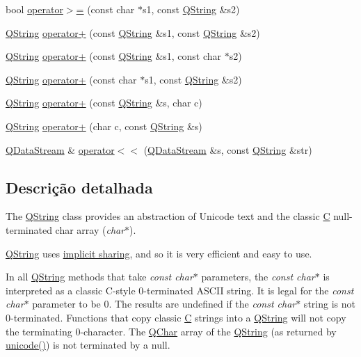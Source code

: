 \begin{DoxyCompactItemize}
\item 
bool \hyperlink{class_q_string_a9f4787df63780750a94f131e7a35ac6c}{operator$>$=} (const char $\ast$s1, const \hyperlink{class_q_string}{Q\-String} \&s2)
\item 
\hyperlink{class_q_string}{Q\-String} \hyperlink{class_q_string_ae485733155e818a24470bab6b39007a3}{operator+} (const \hyperlink{class_q_string}{Q\-String} \&s1, const \hyperlink{class_q_string}{Q\-String} \&s2)
\item 
\hyperlink{class_q_string}{Q\-String} \hyperlink{class_q_string_aeebc8da866e999cf9d98f409149a7274}{operator+} (const \hyperlink{class_q_string}{Q\-String} \&s1, const char $\ast$s2)
\item 
\hyperlink{class_q_string}{Q\-String} \hyperlink{class_q_string_ad31066c16adb556c4e773939da16a894}{operator+} (const char $\ast$s1, const \hyperlink{class_q_string}{Q\-String} \&s2)
\item 
\hyperlink{class_q_string}{Q\-String} \hyperlink{class_q_string_a646dae5a832bf142e3fd6eed4cd29263}{operator+} (const \hyperlink{class_q_string}{Q\-String} \&s, char c)
\item 
\hyperlink{class_q_string}{Q\-String} \hyperlink{class_q_string_ab79668b32f01247149267b5b77669165}{operator+} (char c, const \hyperlink{class_q_string}{Q\-String} \&s)
\item 
\hyperlink{class_q_data_stream}{Q\-Data\-Stream} \& \hyperlink{class_q_string_a5d8281fc5ce5c2b6e6e9fd2b9f66c32c}{operator$<$$<$} (\hyperlink{class_q_data_stream}{Q\-Data\-Stream} \&s, const \hyperlink{class_q_string}{Q\-String} \&str)
\end{DoxyCompactItemize}


\subsection{Descrição detalhada}
The \hyperlink{class_q_string}{Q\-String} class provides an abstraction of Unicode text and the classic \hyperlink{class_c}{C} null-\/terminated char array ({\itshape char$\ast$}). 

\hyperlink{class_q_string}{Q\-String} uses \hyperlink{}{implicit sharing}, and so it is very efficient and easy to use.

In all \hyperlink{class_q_string}{Q\-String} methods that take {\itshape const char$\ast$} parameters, the {\itshape const char$\ast$} is interpreted as a classic C-\/style 0-\/terminated A\-S\-C\-I\-I string. It is legal for the {\itshape const char$\ast$} parameter to be 0. The results are undefined if the {\itshape const char$\ast$} string is not 0-\/terminated. Functions that copy classic \hyperlink{class_c}{C} strings into a \hyperlink{class_q_string}{Q\-String} will not copy the terminating 0-\/character. The \hyperlink{class_q_char}{Q\-Char} array of the \hyperlink{class_q_string}{Q\-String} (as returned by \hyperlink{class_q_string_a65a250696de2e5cb83a8e01a9603cea0}{unicode()}) is not terminated by a null.

